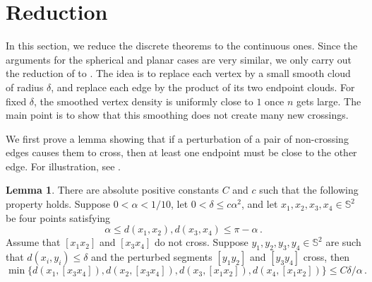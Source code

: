 \documentclass[reqno, 11pt]{amsart}
\theoremstyle{definition}
\newtheorem{lemma}{Lemma}
\begin{document}
\section{Reduction}\label{sec:reduction}
In this section, we reduce the discrete theorems to the continuous ones. Since the arguments for the spherical and planar cases are very similar, we only carry out the reduction of  to .  The idea is to replace each vertex by a small smooth cloud of radius \(\delta\), and replace each edge by the product of its two endpoint clouds.  For fixed \(\delta\), the smoothed vertex density is uniformly close to \(1\) once \(n\) gets large.  The main point is to show that this smoothing does not create many new crossings. 

We first prove a lemma showing that if a perturbation of a pair of non-crossing edges causes them to cross, then at least one endpoint must be close to the other edge. For illustration, see .

\begin{lemma} \label{lem:reduction-new-crossing-geometric}
There are absolute positive constants \(C\) and \(c\) such that the following property holds.  Suppose \(0<\alpha<1/10\), let \(0<\delta\le c\alpha^2\), and let $x_1,x_2,x_3,x_4 \in {\mathbb S}^2$ be four points satisfying
\[
        \alpha\le d(x_1,x_2),d(x_3,x_4)\le \pi-\alpha\,.
\]
Assume that \([x_1x_2]\) and \([x_3x_4]\) do not cross.  Suppose \(y_1,y_2,y_3,y_4\in{\mathbb S}^2\) are such that $d(x_i, y_i) \leq \delta$ and the perturbed segments \([y_1y_2]\) and \([y_3y_4]\) cross, then
\begin{equation}\label{eq:reduction-new-crossing-nearby-endpoint}
        \min\{d(x_1,[x_3x_4]),d(x_2,[x_3x_4]),
              d(x_3,[x_1x_2]),d(x_4,[x_1x_2])\}
        \le C{\delta}/{\alpha}\,.
\end{equation}
\end{lemma}
\end{document}
